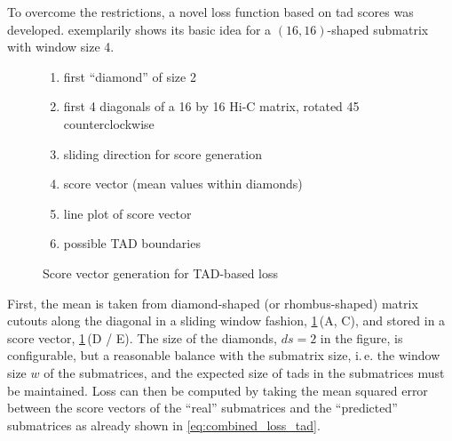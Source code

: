 To overcome the restrictions, a novel loss function based on \acrshort{tad} scores \cite{Crane2015} was developed.
 exemplarily shows its basic idea for a $(16,16)$-shaped submatrix
with window size 4.
\begin{figure}[hbt]
 \begin{minipage}{0.65\textwidth}
    \caption{Score vector generation for TAD-based loss}
    \label{fig:improve:tad_score_loss_function}
 \end{minipage}\hfill
 \begin{minipage}{0.3\textwidth}
 \scriptsize
  \begin{enumerate}[label=\Alph*:,leftmargin=*]
   \raggedright
    \item first ``diamond'' of size 2
    \item first 4 diagonals of a 16 by 16 Hi-C matrix, rotated \SI{45}{\deg} counterclockwise
    \item sliding direction for score generation
    \item score vector (mean values within diamonds)
    \item line plot of score vector
    \item possible TAD boundaries
\end{enumerate}
 \end{minipage}
\end{figure}
First, the mean is taken from diamond-shaped (or rhombus-shaped) matrix cutouts along the diagonal in a sliding window fashion, \cref{fig:improve:tad_score_loss_function}\,(A, C),
and stored in a score vector, \cref{fig:improve:tad_score_loss_function}\,(D / E). 
The size of the diamonds, $ds=2$ in the figure, is configurable, but a reasonable balance with the submatrix size, i.\,e. the window size  $w$ of the submatrices,
and the expected size of \acrshort{tad}s in the submatrices must be maintained.
Loss can then be computed by taking the mean squared error between the score vectors of the ``real'' submatrices and the ``predicted'' submatrices
as already shown in \cref{eq:combined_loss_tad}.

